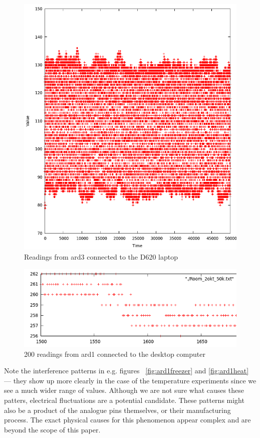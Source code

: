 \documentclass[a4paper]{article}           %
\begin{document}
\begin{figure}[h!]
  \centering
  \includegraphics[width=0.7\columnwidth]{img/ard3gfgarage2.png}
  \caption{Readings from ard3 connected to the D620 laptop}
  \label{fig:gfgarageard3}
\end{figure}

\begin{figure}[h!]


  \centering
  \includegraphics[width=0.7\columnwidth]{img/Room_1500-1700_zoom.png}
  \caption{200 readings from ard1 connected to the desktop computer}
  \label{fig:ardzoom}

\end{figure}


Note the interference patterns in e.g. figures ~\ref{fig:ard1freezer} and \ref{fig:ard1heat} --- they show up more clearly in the case of the temperature experiments since we see a much wider range of values. Although we are not sure what causes these patters, electrical fluctuations are a potential candidate. These patterns might also be a product of the analogue pins themselves, or their manufacturing process. The exact physical causes for this phenomenon appear complex and are beyond the scope of this paper. 
\end{document}
